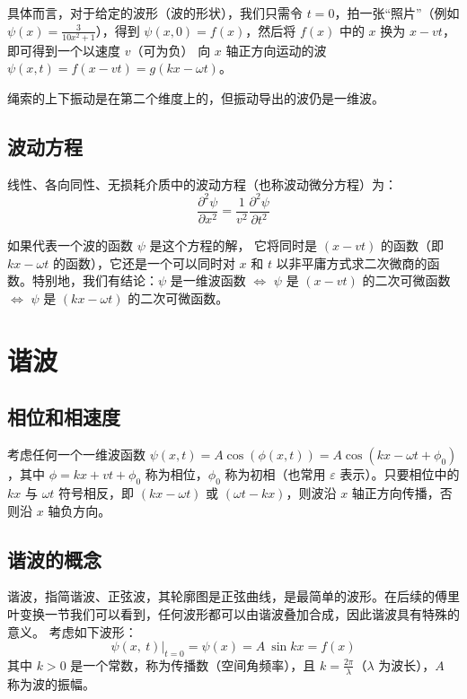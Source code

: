 \documentclass[UTF8]{report}
\theoremstyle{MyLineTheoremStyle} %
\theoremstyle{MyBlockTheoremStyle} %
\theoremstyle{MySubsubsectionStyle} %
\begin{document}
具体而言，对于给定的波形（波的形状），我们只需令 $t=0$，拍一张“照片”（例如 $\psi(x) = \frac{3}{10x^2+1}$），得到 $\psi(x,0) = f(x)$，然后将 $f(x)$ 中的 $x$ 换为 $x-vt$，即可得到一个以速度 $v$（可为负） 向 $x$ 轴正方向运动的波 $\psi(x,t) = f(x - vt) = g(kx - \omega t)$。
{\par\color{gray}\small
绳索的上下振动是在第二个维度上的，但振动导出的波仍是一维波。
\par}


\subsection{波动方程}

线性、各向同性、无损耗介质中的波动方程（也称波动微分方程）为：
\begin{equation}
    \frac{\partial^{2}\psi}{\partial x^{2}}=\frac{1}{v^{2}}\frac{\partial^{2}\psi}{\partial t^{2}} 
\end{equation}

如果代表一个波的函数 $\psi$ 是这个方程的解， 它将同时是 $(x-vt)$ 的函数（即 $kx - \omega t$ 的函数），它还是一个可以同时对 $x$ 和 $t$ 以非平庸方式求二次微商的函数。特别地，我们有结论：$\psi$ 是一维波函数 $\Longleftrightarrow$ $\psi$ 是 $(x-vt)$ 的二次可微函数 $\Longleftrightarrow$ $\psi$ 是 $(kx - \omega t)$ 的二次可微函数。

\section{谐波}

\subsection{相位和相速度}
考虑任何一个一维波函数 $\psi(x,t) = A \cos(\phi(x,t)) = A \cos (kx - \omega t + \phi_0) $，其中 $\phi = kx+vt + \phi_0$ 称为相位，$\phi_0$ 称为初相（也常用 $\varepsilon$ 表示）。只要相位中的 $kx$ 与 $\omega t$ 符号相反，即 $(kx - \omega t)$ 或 $(\omega t - kx)$，则波沿 $x$ 轴正方向传播，否则沿 $x$ 轴负方向。


\subsection{谐波的概念} 
谐波，指简谐波、正弦波，其轮廓图是正弦曲线，是最简单的波形。在后续的傅里叶变换一节我们可以看到，任何波形都可以由谐波叠加合成，因此谐波具有特殊的意义。
考虑如下波形：
\begin{equation}
    \psi(x,\:t)\big|_{t=0}=\psi(x)=A\:\sin kx=f(x)
\end{equation}
其中 $k>0$ 是一个常数，称为传播数（空间角频率），且 $k = \frac{2\pi}{\lambda} $（$\lambda$ 为波长），$A$ 称为波的振幅。\par
\end{document}
